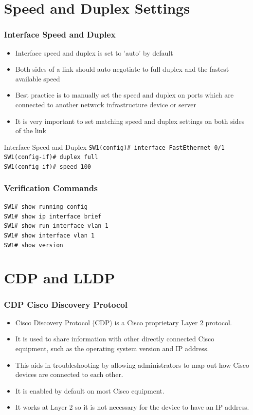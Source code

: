 \documentclass[pdflatex,compress,mathserif]{beamer}
\begin{document}
\section{Speed and Duplex Settings}

\begin{frame}
	\frametitle{Interface Speed and Duplex}
	\begin{itemize}
		\item Interface speed and duplex is set to 'auto' by default
		\item Both sides of a link should auto-negotiate to full duplex and the fastest available speed
		\item Best practice is to manually set the speed and duplex on ports which are connected to another network infrastructure device or server
		\item It is very important to set matching speed and duplex settings on both sides of the link
	\end{itemize}
\end{frame}

\begin{frame}{Interface Speed and Duplex}
	\texttt{SW1(config)\# interface FastEthernet 0/1 \\
		SW1(config-if)\# duplex full \\
		SW1(config-if)\# speed 100}
\end{frame}

\begin{frame}
	\frametitle{Verification Commands}
	\texttt{SW1\# show running-config \\
	SW1\# show ip interface brief \\
	SW1\# show run interface vlan 1 \\
	SW1\# show interface vlan 1 \\
	SW1\# show version \\}
\end{frame}

\section{CDP and LLDP}

\begin{frame}
	\frametitle{CDP Cisco Discovery Protocol}
	\begin{itemize}
		\item Cisco Discovery Protocol (CDP) is a Cisco proprietary Layer 2 protocol.
		\item It is used to share information with other directly connected Cisco equipment, such as the operating system version and IP address.
		\item This aids in troubleshooting by allowing administrators to map out how Cisco devices are connected to each other.
		\item It is enabled by default on most Cisco equipment.
		\item It works at Layer 2 so it is not necessary for the device to have an IP address.
	\end{itemize}
\end{frame}
\end{document}
